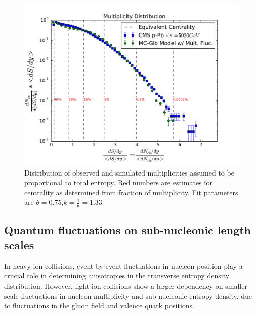 \documentclass[preprint,showpacs,amsfonts,aps,prl,nofootinbib,floatfix]{revtex4}
\begin{document}
\begin{figure}[!ht] 
	\includegraphics[width = \linewidth]{figs/TotalEntropyDist.pdf}
	\caption{Distribution of observed and simulated multiplicities assumed to be proportional to total entropy. Red numbers are estimates for centrality as determined from fraction of multiplicity. Fit parameters are $\theta=0.75$,$k=\frac{1}{\theta}=1.33$}
	\label{fig:pPbMultDist}
\end{figure}
\subsection{Quantum fluctuations on sub-nucleonic length scales}
\label{sec2b}
In heavy ion collisions, event-by-event fluctuations in nucleon position play a crucial role in determining anisotropies in the transverse entropy density distribution. However, light ion collisions show a larger dependency on smaller scale fluctuations in nucleon multiplicity and sub-nucleonic entropy density, due to fluctuations in the gluon field and valence quark positions.
\end{document}
